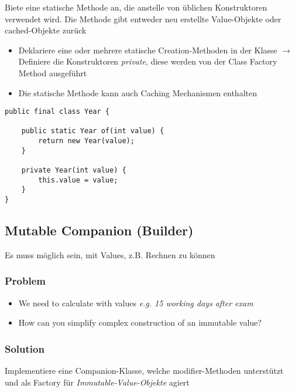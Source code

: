 Biete eine statische Methode an, die anstelle von üblichen Konstruktoren verwendet wird. Die Methode gibt entweder neu erstellte Value-Objekte oder cached-Objekte zurück

\begin{itemize}
    \item Deklariere eine oder mehrere statische Creation-Methoden in der Klasse $\rightarrow$ Definiere die Konstruktoren \textit{private}, diese werden von der Class Factory Method ausgeführt
    \item Die statische Methode kann auch Caching Mechanismen enthalten
\end{itemize}
\begin{lstlisting}
public final class Year {

    public static Year of(int value) {
        return new Year(value);
    }

    private Year(int value) {
        this.value = value;
    }
}
\end{lstlisting}

\vfill\null
\columnbreak

\subsection{Mutable Companion (Builder)}

Es muss möglich sein, mit Values, z.B. Rechnen zu können

\subsubsection{Problem}
\begin{itemize}
    \item We need to calculate with values \textit{e.g. 15 working days after exam}
    \item How can you simplify complex construction of an immutable value?
\end{itemize}

\subsubsection{Solution}

Implementiere eine Companion-Klasse, welche modifier-Methoden unterstützt und als Factory für \textit{Immutable-Value-Objekte} agiert

